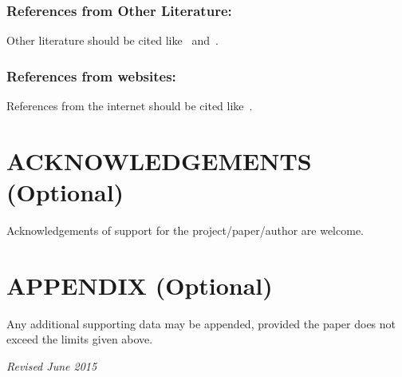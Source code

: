 \documentclass{isprs}
\begin{document}
\subsubsection{References from Other Literature:}
Other literature should be cited like~\cite{smith1987rep} and~\cite{smith2000}.

\subsubsection{References from websites:}
References from the internet should be cited like~\cite{moons1997}.

\section*{ACKNOWLEDGEMENTS (Optional)}\label{ACKNOWLEDGEMENTS}

Acknowledgements of support for the project/paper/author are welcome. 

{%
	\begin{spacing}{0.9}%
	\end{spacing}
}








\section*{APPENDIX (Optional)}\label{APPENDIX}

Any additional supporting data may be appended, provided the paper does not exceed the limits given above. 

\vspace{1cm}
\textit{Revised June 2015}
\end{document}
